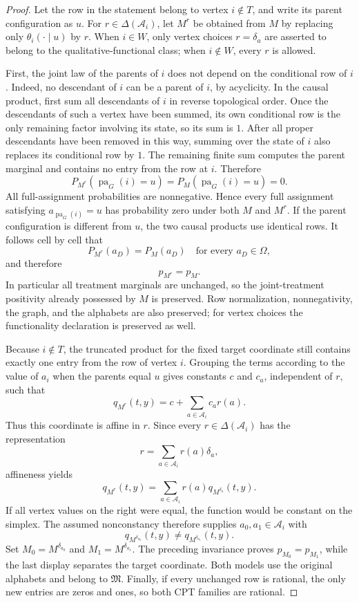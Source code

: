 \documentclass{article}
\begin{document}
\begin{proof}
Let the row in the statement belong to vertex \(i\notin T\), and write its parent configuration as \(u\).  For \(r\in\Delta(\mathcal A_i)\), let \(M^r\) be obtained from \(M\) by replacing only \(\theta_i(\cdot\mid u)\) by \(r\).  When \(i\in W\), only vertex choices \(r=\delta_a\) are asserted to belong to the qualitative-functional class; when \(i\notin W\), every \(r\) is allowed.

First, the joint law of the parents of \(i\) does not depend on the conditional row of \(i\).  Indeed, no descendant of \(i\) can be a parent of \(i\), by acyclicity.  In the causal product, first sum all descendants of \(i\) in reverse topological order.  Once the descendants of such a vertex have been summed, its own conditional row is the only remaining factor involving its state, so its sum is \(1\).  After all proper descendants have been removed in this way, summing over the state of \(i\) also replaces its conditional row by \(1\).  The remaining finite sum computes the parent marginal and contains no entry from the row at \(i\).  Therefore
\[
 P_{M^r}(\operatorname{pa}_G(i)=u)
 =P_M(\operatorname{pa}_G(i)=u)=0.
\]
All full-assignment probabilities are nonnegative.  Hence every full assignment satisfying \(a_{\operatorname{pa}_G(i)}=u\) has probability zero under both \(M\) and \(M^r\).  If the parent configuration is different from \(u\), the two causal products use identical rows.  It follows cell by cell that
\[
 P_{M^r}(a_D)=P_M(a_D)
 \quad\text{for every }a_D\in\Omega,
\]
and therefore
\[
 p_{M^r}=p_M.
\]
In particular all treatment marginals are unchanged, so the joint-treatment positivity already possessed by \(M\) is preserved.  Row normalization, nonnegativity, the graph, and the alphabets are also preserved; for vertex choices the functionality declaration is preserved as well.

Because \(i\notin T\), the truncated product for the fixed target coordinate still contains exactly one entry from the row of vertex \(i\).  Grouping the terms according to the value of \(a_i\) when the parents equal \(u\) gives constants \(c\) and \(c_a\), independent of \(r\), such that
\[
 q_{M^r}(t,y)=c+\sum_{a\in\mathcal A_i}c_a r(a).
\]
Thus this coordinate is affine in \(r\).  Since every
\(r\in\Delta(\mathcal A_i)\) has the representation
\[
 r=\sum_{a\in\mathcal A_i}r(a)\delta_a,
\]
affineness yields
\[
 q_{M^r}(t,y)
 =\sum_{a\in\mathcal A_i}r(a)
   q_{M^{\delta_a}}(t,y).
\]
If all vertex values on the right were equal, the function would be constant on the simplex.  The assumed nonconstancy therefore supplies \(a_0,a_1\in\mathcal A_i\) with
\[
 q_{M^{\delta_{a_0}}}(t,y)
 \ne q_{M^{\delta_{a_1}}}(t,y).
\]
Set \(M_0=M^{\delta_{a_0}}\) and \(M_1=M^{\delta_{a_1}}\).  The preceding invariance proves \(p_{M_0}=p_{M_1}\), while the last display separates the target coordinate.  Both models use the original alphabets and belong to \(\mathfrak M\).  Finally, if every unchanged row is rational, the only new entries are zeros and ones, so both CPT families are rational.
\end{proof}
\end{document}
